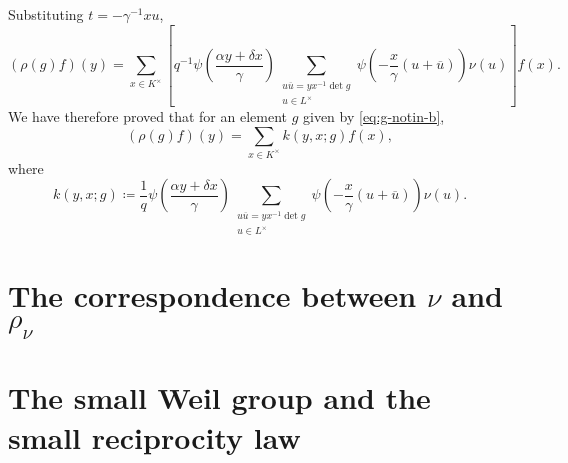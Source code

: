 \documentclass[../main.tex]{subfiles}
\begin{document}
Substituting $t=-\gamma^{-1}xu$,
\[(\rho(g)f)(y)=\sum_{x\in K^\times}\left[q^{-1}\psi\left(\frac{\alpha y+\delta x}\gamma\right)\sum_{\substack{u\overline u=yx^{-1}\det g\\u\in L^\times}}\psi\left(-\frac x\gamma(u+\overline u)\right)\nu(u)\right]f(x).\]
We have therefore proved that for an element $g$ given by \eqref{eq:g-notin-b},
\[(\rho(g)f)(y)=\sum_{x\in K^\times}k(y,x;g)f(x),\]
where
\[k(y,x;g)\coloneqq\frac1q\psi\left(\frac{\alpha y+\delta x}\gamma\right)\sum_{\substack{u\overline u=yx^{-1}\det g\\u\in L^\times}}\psi\left(-\frac x\gamma(u+\overline u)\right)\nu(u).\]

\section{The correspondence between \texorpdfstring{$\nu$}{ v} and \texorpdfstring{$\rho_\nu$}{ pv}}

\section{The small Weil group and the small reciprocity law} \label{sec:weil-group}
\end{document}
